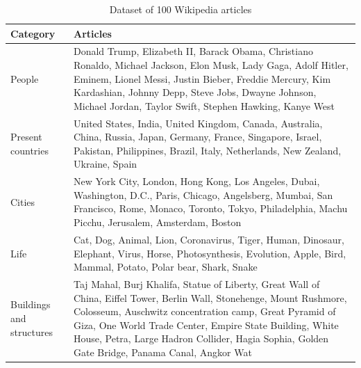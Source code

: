 \documentclass[12pt,oneside]{memoir}
\begin{document}
\begin{table}[ht]
    \centering
    \begin{tabular}{p{1in}p{3.8in}}
        \toprule
        \textbf{Category} & \textbf{Articles} \\
        \midrule
        People & Donald Trump, Elizabeth II, Barack Obama, Christiano Ronaldo, Michael Jackson, Elon Musk, Lady Gaga, Adolf Hitler, Eminem, Lionel Messi, Justin Bieber, Freddie Mercury, Kim Kardashian, Johnny Depp, Steve Jobs, Dwayne Johnson, Michael Jordan, Taylor Swift, Stephen Hawking, Kanye West\\
        \midrule
        Present countries & United States, India, United Kingdom, Canada, Australia, China, Russia, Japan, Germany, France, Singapore, Israel, Pakistan, Philippines, Brazil, Italy, Netherlands, New Zealand, Ukraine, Spain\\
        \midrule
        Cities & New York City, London, Hong Kong, Los Angeles, Dubai, Washington, D.C., Paris, Chicago, Angelsberg, Mumbai, San Francisco, Rome, Monaco, Toronto, Tokyo, Philadelphia, Machu Picchu, Jerusalem, Amsterdam, Boston\\
        \midrule
        Life & Cat, Dog, Animal, Lion, Coronavirus, Tiger, Human, Dinosaur, Elephant, Virus, Horse, Photosynthesis, Evolution, Apple, Bird, Mammal, Potato, Polar bear, Shark, Snake\\
        \midrule
        Buildings and structures & Taj Mahal, Burj Khalifa, Statue of Liberty, Great Wall of China, Eiffel Tower, Berlin Wall, Stonehenge, Mount Rushmore, Colosseum, Auschwitz concentration camp, Great Pyramid of Giza, One World Trade Center, Empire State Building, White House, Petra, Large Hadron Collider, Hagia Sophia, Golden Gate Bridge, Panama Canal, Angkor Wat\\
        \bottomrule
    \end{tabular}
    \caption{Dataset of 100 Wikipedia articles}
    \label{table:dataset}
\end{table}
\end{document}
